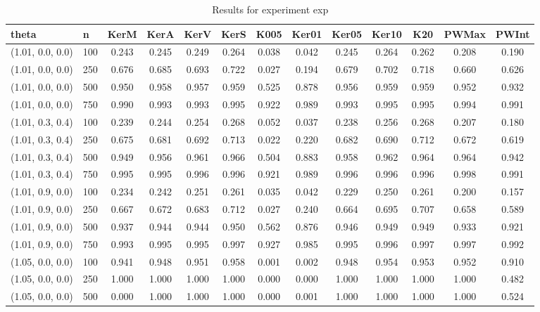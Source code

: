     \begin{table}[ht]
    \centering
    
    \caption{Results for experiment exp}
    \tiny{
\begin{tabular}{ll|ccccccccccc}
\hline
theta & n & KerM & KerA & KerV & KerS & K005 & Ker01 & Ker05 & Ker10 & K20 & PWMax & PWInt \\
\hline
(1.01, 0.0, 0.0) & 100 & 0.243 & 0.245 & 0.249 & 0.264 & 0.038 & 0.042 & 0.245 & 0.264 & 0.262 & 0.208 & 0.190 \\
(1.01, 0.0, 0.0) & 250 & 0.676 & 0.685 & 0.693 & 0.722 & 0.027 & 0.194 & 0.679 & 0.702 & 0.718 & 0.660 & 0.626 \\
(1.01, 0.0, 0.0) & 500 & 0.950 & 0.958 & 0.957 & 0.959 & 0.525 & 0.878 & 0.956 & 0.959 & 0.959 & 0.952 & 0.932 \\
(1.01, 0.0, 0.0) & 750 & 0.990 & 0.993 & 0.993 & 0.995 & 0.922 & 0.989 & 0.993 & 0.995 & 0.995 & 0.994 & 0.991 \\
(1.01, 0.3, 0.4) & 100 & 0.239 & 0.244 & 0.254 & 0.268 & 0.052 & 0.037 & 0.238 & 0.256 & 0.268 & 0.207 & 0.180 \\
(1.01, 0.3, 0.4) & 250 & 0.675 & 0.681 & 0.692 & 0.713 & 0.022 & 0.220 & 0.682 & 0.690 & 0.712 & 0.672 & 0.619 \\
(1.01, 0.3, 0.4) & 500 & 0.949 & 0.956 & 0.961 & 0.966 & 0.504 & 0.883 & 0.958 & 0.962 & 0.964 & 0.964 & 0.942 \\
(1.01, 0.3, 0.4) & 750 & 0.995 & 0.995 & 0.996 & 0.996 & 0.921 & 0.989 & 0.996 & 0.996 & 0.996 & 0.998 & 0.991 \\
(1.01, 0.9, 0.0) & 100 & 0.234 & 0.242 & 0.251 & 0.261 & 0.035 & 0.042 & 0.229 & 0.250 & 0.261 & 0.200 & 0.157 \\
(1.01, 0.9, 0.0) & 250 & 0.667 & 0.672 & 0.683 & 0.712 & 0.027 & 0.240 & 0.664 & 0.695 & 0.707 & 0.658 & 0.589 \\
(1.01, 0.9, 0.0) & 500 & 0.937 & 0.944 & 0.944 & 0.950 & 0.562 & 0.876 & 0.946 & 0.949 & 0.949 & 0.933 & 0.921 \\
(1.01, 0.9, 0.0) & 750 & 0.993 & 0.995 & 0.995 & 0.997 & 0.927 & 0.985 & 0.995 & 0.996 & 0.997 & 0.997 & 0.992 \\
(1.05, 0.0, 0.0) & 100 & 0.941 & 0.948 & 0.951 & 0.958 & 0.001 & 0.002 & 0.948 & 0.954 & 0.953 & 0.952 & 0.910 \\
(1.05, 0.0, 0.0) & 250 & 1.000 & 1.000 & 1.000 & 1.000 & 0.000 & 0.000 & 1.000 & 1.000 & 1.000 & 1.000 & 0.482 \\
(1.05, 0.0, 0.0) & 500 & 0.000 & 1.000 & 1.000 & 1.000 & 0.000 & 0.001 & 1.000 & 1.000 & 1.000 & 1.000 & 0.524 \\

\end{tabular}}
\end{table}
